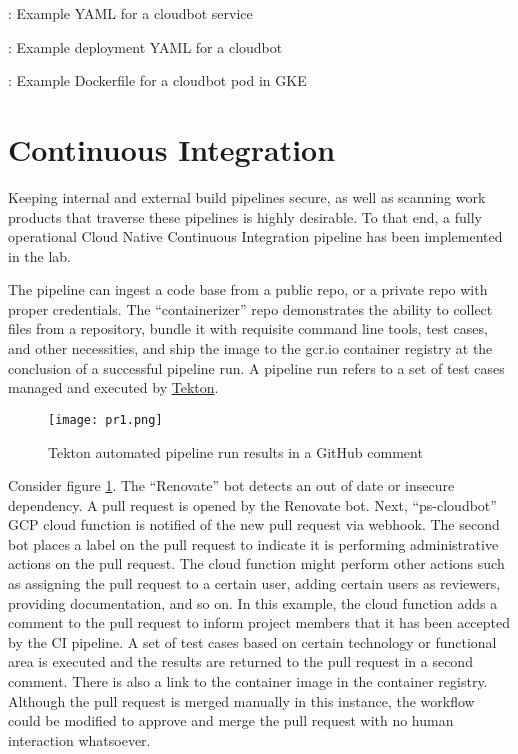 \begin{mybox}{\thetcbcounter: Example YAML for a cloudbot service}
	
\end{mybox}
\vspace{2mm}

\begin{mybox}{\thetcbcounter: Example deployment YAML for a cloudbot}
	
\end{mybox}
\vspace{2mm}

\begin{mybox}{\thetcbcounter: Example Dockerfile for a cloudbot pod in GKE}
	
\end{mybox}
\vspace{2mm}

\section{\label{sec:CI}Continuous Integration}
\vspace{2mm}

Keeping internal and external build pipelines secure, as well as scanning work products that traverse these pipelines is highly desirable. To that end, a
fully operational Cloud Native Continuous Integration pipeline has been implemented in the lab.

The pipeline can ingest a code base from a public repo, or a private repo with proper credentials. The ``containerizer'' repo demonstrates the ability
to collect files from a repository, bundle it with requisite command line tools, test cases, and other necessities, and ship the image to the gcr.io container
registry at the conclusion of a successful pipeline run. A pipeline run refers to a set of test cases managed and executed by \href{https://tekton.dev/}{Tekton}.


\begin{figure}[H]
	\texttt{[image: pr1.png]}
	\caption{Tekton automated pipeline run results in a GitHub comment}
	\label{pr}
\end{figure}


Consider figure \ref{pr}. The ``Renovate'' bot detects an out of date or insecure dependency. A pull request is opened by the Renovate bot. 
Next, ``ps-cloudbot'' GCP cloud function is notified of the new pull request via webhook. The second bot places a label on the pull request to indicate
it is performing administrative actions on the pull request. The cloud function might perform other actions such as assigning the pull request to a certain user,
adding certain users as reviewers, providing documentation, and so on. In this example, the cloud function adds a comment to the pull request to inform
project members that it has been accepted by the CI pipeline. A set of test cases based on certain technology or functional area is executed and the
results are returned to the pull request in a second comment. There is also a link to the container image in the container registry. Although the pull
request is merged manually in this instance, the workflow could be modified to approve and merge the pull request with no human interaction whatsoever.

